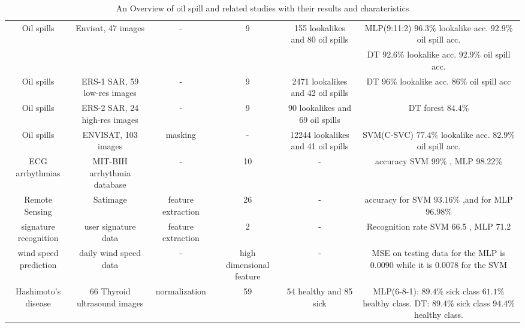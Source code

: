 \begin{table*}[t]
{\begin{tabular}{*{6}{c}}
    Oil spills\cite{Mera201472} &  Envisat, 47 images & - & 9 & 155 lookalikes and 80 oil spills & MLP(9:11:2) $96.3$\% lookalike acc. $92.9$\% oil spill acc. \\
    & & & & & DT $92.6$\% lookalike acc. $92.9$\% oil spill acc. \\
    
    Oil spills\cite{Delfrate1996} &  ERS-1 SAR, 59 low-res images & - & 9 & 2471 lookalikes and 42 oil spills & DT $96$\% lookalike acc. $86$\% oil spill acc\\
    
    Oil spills\cite{Topouzelis201268} &  ERS-2 SAR, 24 high-res images & - & 9 & 90 lookalikes and 69 oil spills & DT forest $84.4$\%\\ 
    
    Oil spills\cite{brekke2008classifiers} & ENVISAT, 103 images & masking & - & 12244 lookalikes and 41 oil spills & SVM(C-SVC) $77.4$\% lookalike acc. $82.9$\% oil spill acc.\\

    ECG arrhythmias\cite{Moavenian20103088} & MIT-BIH arrhythmia database & - & 10 & - & accuracy SVM 99\% , MLP 98.22\% \\

    Remote Sensing\cite{Zanaty2012177} & Satimage & feature extraction & 26& - & accuracy for SVM 93.16\% ,and for MLP 96.98\%\\
    
    signature recognition\cite{FriasMartinez2006693} & user signature data &feature extraction& 2 & - & Recognition rate SVM 66.5  , MLP 71.2\\
    wind speed prediction\cite{Mohandes2004939}& daily wind speed data & - &high dimensional feature & - & MSE on testing data for the MLP is 0.0090 while it is 0.0078 for the SVM\\
    
    Hashimoto's disease\cite{Omiotek201340} &  66 Thyroid ultrasound images & normalization & 59 & 54 healthy and 85 sick & MLP(6-8-1): $89.4$\% sick class $61.1$\% healthy class. DT: $89.4$\% sick class $94.4$\% healthy class. \\
    
    
\end{tabular}
}
\caption{An Overview of oil spill and related studies with their results and charateristics}
\label{fig:table}
\end{table*}

